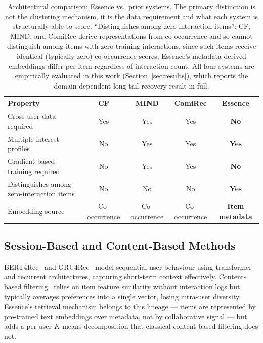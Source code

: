 \documentclass[11pt,a4paper]{article}
\begin{document}
\begin{table}[H]
\centering
\caption{Architectural comparison: Essence vs.\ prior systems.
         The primary distinction is not the clustering mechanism,
         it is the data requirement and what each system is structurally
         able to score. ``Distinguishes among zero-interaction items'':
         CF, MIND, and ComiRec derive representations from co-occurrence
         and so cannot distinguish among items with zero training
         interactions, since such items receive identical (typically
         zero) co-occurrence scores; Essence's metadata-derived
         embeddings differ per item regardless of interaction count.
         All four systems are empirically evaluated in this work
         (Section~\ref{sec:results}), which reports the domain-dependent
         long-tail recovery result in full.}
\label{tab:comparison}
\small
\setlength{\tabcolsep}{5pt}
\begin{tabular}{p{4.6cm}cccc}
\toprule
\textbf{Property} & \textbf{CF} & \textbf{MIND} & \textbf{ComiRec}
                  & \textbf{Essence} \\
\midrule
Cross-user data required    & Yes  & Yes  & Yes  & \textbf{No}  \\
Multiple interest profiles  & No   & Yes  & Yes  & \textbf{Yes} \\
Gradient-based training required & No  & Yes  & Yes  & \textbf{No}  \\
Distinguishes among zero-interaction items & No & No & No & \textbf{Yes} \\
Embedding source            & Co-occurrence & Co-occurrence
                            & Co-occurrence & \textbf{Item metadata} \\
\bottomrule
\end{tabular}
\end{table}

\subsection{Session-Based and Content-Based Methods}
BERT4Rec~\cite{sun2019} and GRU4Rec~\cite{hidasi2016} model sequential user
behaviour using transformer and recurrent architectures, capturing short-term
context effectively. Content-based filtering~\cite{pazzani2007} relies on item feature
similarity without interaction logs but typically averages preferences
into a single vector, losing intra-user diversity. Essence's retrieval
mechanism belongs to this lineage --- items are represented by
pre-trained text embeddings over metadata, not by collaborative signal
--- but adds a per-user $K$-means decomposition that classical
content-based filtering does not.
\end{document}
